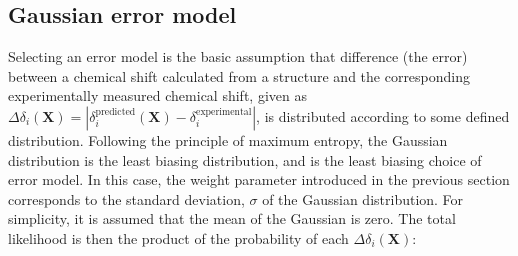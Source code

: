 \subsection{Gaussian error model}
Selecting an error model is the basic assumption that difference (the error) between a chemical shift calculated from a structure and the corresponding experimentally measured chemical shift, given as $\Delta\delta_i(\mathbf X) = \left| \delta_i^{\mathrm{predicted}}(\mathbf X) - \delta_i^{\mathrm{experimental}}\right|$, is distributed according to some defined distribution.
Following the principle of maximum entropy, the Gaussian distribution is the least biasing distribution, and is the least biasing choice of error model.
In this case, the weight parameter introduced in the previous section corresponds to the standard deviation, $\sigma$ of the Gaussian distribution.
For simplicity, it is assumed that the mean of the Gaussian is zero.
The total likelihood is then the product of the probability of each $\Delta\delta_i(\mathbf X)$:

